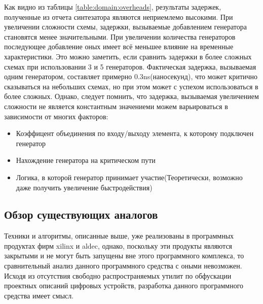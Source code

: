 Как видно из таблицы \ref{table:domain:overheads}, результаты задержек, полученные из отчета синтезатора являются неприемлемо высокими. При увеличении сложности схемы, задержки, вызываемые добавлением генератора становятся менее значительными. При увеличении количества генераторов последующее добавление оных имеет всё меньшее влияние на временные характеристики. Это можно заметить, если сравнить задержки в более сложных схемах при использовании 3 и 5 генераторов. Фактическая задержка, вызываемая одним генератором, составляет примерно 0.3ns(наносекунд), что может критично сказываться на небольших схемах, но при этом может с успехом использоваться в более сложных. Однако, следует помнить, что задержка, вызываемая увеличением сложности не является константным значениеми можем варьироваться в зависимости от многих факторов:
\begin{itemize}
\item Коэффицент объединения по входу/выходу элемента, к которому подключен генератор
\item Нахождение генератора на критическом пути
\item Логика, в которой генератор принимает участие(Теоретически, возможно даже получить увеличение быстродействия)
\end{itemize}

\subsection{Обзор существующих аналогов}

Техники и алгоритмы, описанные выше, уже реализованы в программных продуктах фирм xilinx и aldec, однако, поскольку эти продукты являются закрытыми и не могут быть запущены вне этого программного комплекса, то сравнительный анализ данного программного средства с оными невозможен. Исходя из отсутствия свободно распространяемых утилит по обфускации проектных описаний цифровых устройств, разработка данного программного средства имеет смысл.


